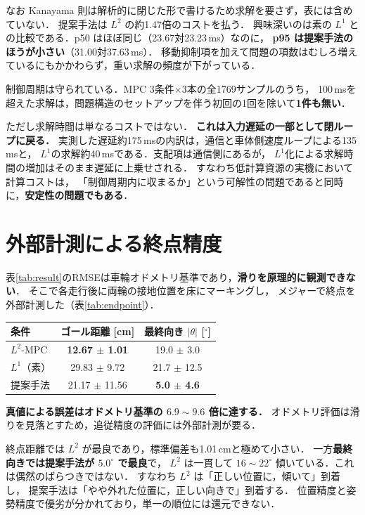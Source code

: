 \documentclass[a4jsme,9pt,dvipdfmx]{jsmepaper_robomec}
\begin{document}
なお Kanayama 則は解析的に閉じた形で書けるため求解を要さず，表には含めていない．
提案手法は $L^2$ の約1.47倍のコストを払う．
興味深いのは素の $L^1$ との比較である．p50 はほぼ同じ（23.67対23.23\,ms）なのに，
\textbf{p95 は提案手法のほうが小さい}（31.00対37.63\,ms）．
移動抑制項を加えて問題の項数はむしろ増えているにもかかわらず，重い求解の頻度が下がっている．

制御周期は守られている．MPC 3条件$\times$3本の全1769サンプルのうち，
100\,msを超えた求解は，問題構造のセットアップを伴う初回の1回を除いて\textbf{1件も無い}．

ただし求解時間は単なるコストではない．
\textbf{これは入力遅延の一部として閉ループに戻る．}
実測した遅延約175\,msの内訳は，通信と車体側速度ループによる135\,msと，
$L^1$の求解約40\,msである．支配項は通信側にあるが，
$L^1$化による求解時間の増加はそのまま遅延に上乗せされる．
すなわち低計算資源の実機において計算コストは，
「制御周期内に収まるか」という可解性の問題であると同時に，\textbf{安定性の問題でもある}．

\section{外部計測による終点精度}
表\ref{tab:result}のRMSEは車輪オドメトリ基準であり，\textbf{滑りを原理的に観測できない}．
そこで各走行後に両輪の接地位置を床にマーキングし，
メジャーで終点を外部計測した（表\ref{tab:endpoint}）．

\begin{center}
    \label{tab:endpoint}
    \begin{tabular}{lcc}
      \hline
      条件 & ゴール距離 [cm] & 最終向き $|\theta|$ [$^\circ$] \\
      \hline
      $L^2$-MPC   & \textbf{12.67 $\pm$ 1.01} & 19.0 $\pm$ 3.0 \\
      $L^1$（素）  & 29.83 $\pm$ 9.72 & 21.7 $\pm$ 12.5 \\
      提案手法     & 21.17 $\pm$ 11.56 & \textbf{5.0 $\pm$ 4.6} \\
      \hline
    \end{tabular}
\end{center}

\textbf{真値による誤差はオドメトリ基準の $6.9\sim9.6$ 倍に達する．}
オドメトリ評価は滑りを見落とすため，追従精度の評価には外部計測が要る．

終点距離では $L^2$ が最良であり，標準偏差も1.01\,cmと極めて小さい．
一方\textbf{最終向きでは提案手法が $5.0^\circ$ で最良}で，
$L^2$ は一貫して $16\sim22^\circ$ 傾いている．これは偶然のばらつきではない．
すなわち $L^2$ は「正しい位置に，傾いて」到着し，
提案手法は「やや外れた位置に，正しい向きで」到着する．
位置精度と姿勢精度で優劣が分かれており，単一の順位には還元できない．
\end{document}
